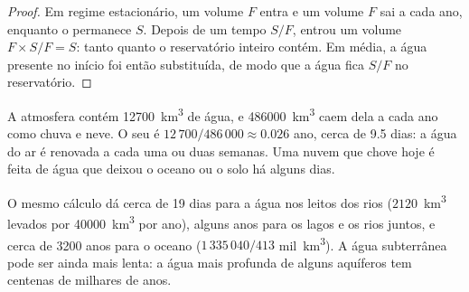 \begin{proof}
Em regime estacionário, um volume $F$ entra e um volume $F$ sai a cada ano,
enquanto o  permanece $S$. Depois de um tempo $S/F$, entrou um volume
$F \times S/F = S$: tanto quanto o reservatório inteiro contém. Em média, a
água presente no início foi então substituída, de modo que a água fica $S/F$
no reservatório.
\end{proof}

\begin{example}[A água no ar]\label{ex:g10:freshwater-resources:atmosphere}
A atmosfera contém \num{12700}~\unit{km^3} de água, e
\num{486000}~\unit{km^3} caem dela a cada ano como chuva e neve. O seu
 é $12\,700/486\,000 \approx \num{0.026}$ ano, cerca de
\num{9.5} dias: a água do ar é renovada a cada uma ou duas semanas. Uma nuvem
que chove hoje é feita de água que deixou o oceano ou o solo há alguns
dias.
\end{example}

O mesmo cálculo dá cerca de \num{19} dias para a água nos leitos dos rios
($2120$~\unit{km^3} levados por \num{40000}~\unit{km^3} por ano), alguns
anos para os lagos e os rios juntos, e cerca de \num{3200} anos para o
oceano ($1\,335\,040/413$ mil~\unit{km^3}). A água subterrânea pode ser
ainda mais lenta: a água mais profunda de alguns aquíferos tem centenas de
milhares de anos.

